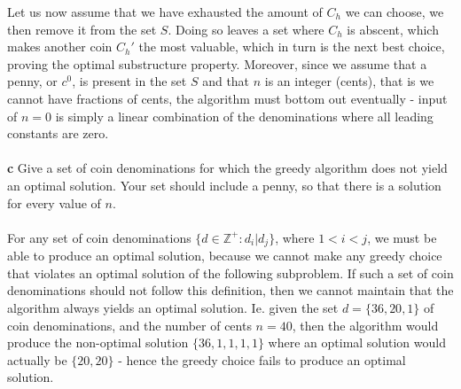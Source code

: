 \documentclass[11pt,english]{article}
\begin{document}
Let us now assume that we have exhausted the amount of $C_h$ we can choose,
we then remove it from the set $S$. Doing so leaves a set where $C_h$ is
abscent, which makes another coin $C_h'$ the most valuable, which in turn is
the next best choice, proving the optimal substructure property. Moreover,
since we assume that a penny, or $c^0$, is present in the set $S$ and that
$n$ is an integer (cents), that is we cannot have fractions of cents, the
algorithm must bottom out eventually - input of $n = 0$ is simply a linear
combination of the denominations where all leading constants are zero.
\\\\
\noindent \large{\textbf{c} Give a set of coin denominations for which the greedy algorithm
does not yield an optimal solution. Your set should include a penny, so
that there is a solution for every value of $n$.}
\\\\
For any set of coin denominations
$\{d \in \mathbb{Z}^{+} : d_i | d_{j}\}$, where $1 < i < j$, we must be able to
produce an optimal solution, because we cannot make any greedy choice that
violates an optimal solution of the following subproblem. If such a set of
coin denominations should not follow this definition, then we cannot maintain
that the algorithm always yields an optimal solution. Ie. given the set
$d = \{36, 20, 1\}$ of coin denominations, and the number of cents $n = 40$,
then the algorithm would produce the non-optimal solution $\{36, 1, 1, 1, 1\}$
where an optimal solution would actually be $\{20, 20\}$ - hence the greedy
choice fails to produce an optimal solution.
\end{document}

